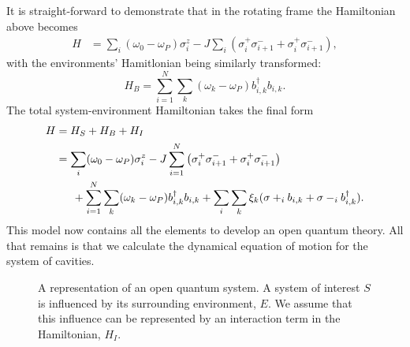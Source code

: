 \documentclass[11pt,a4paper,article,oneside]{memoir}
\newcommand{\Gap}{\,\,\,\,\,\,\,\,\,} \newcommand{\Ua}{\uparrow}
\begin{document}
It is straight-forward to demonstrate that in the rotating frame the
Hamiltonian above becomes
\begin{align}
  H&=\sum_i(\omega_0-\omega_P) \sigma^z_i -J \sum_i
  (\sigma^+_i\sigma^-_{i+1}+\sigma^+_i\sigma^-_{i+1}),
\end{align}
with the environments' Hamitlonian being similarly transformed:
\begin{equation}
  H_B = \sum_{i=1}^N\sum_k(\omega_k-\omega_P)b^\dagger_{i,k}b_{i,k}.
\end{equation}
The total system-environment Hamiltonian takes the final form
\begin{align}
  H &= H_S + H_B + H_I \notag \\ &= \sum_i(\omega_0-\omega_P)
  \sigma^z_i-J\sum_{i=1}^N
  \left(\sigma^+_i\sigma^-_{i+1}+\sigma^+_i\sigma^-_{i+1}\right)
  \notag
  \\ &\Gap+\sum_{i=1}^N\sum_k(\omega_k-\omega_P)b^\dagger_{i,k}b_{i,k}
  + \sum_i \sum_k \xi_k (\sigma+_ib_{i,k}+\sigma-_ib^\dagger_{i,k}).
\end{align}
This model now contains all the elements to develop an open quantum
theory. All that remains is that we calculate the dynamical equation
of motion for the system of cavities.
\begin{figure}
  \begin{center}
  \end{center}
  \caption{A representation of an open quantum system. A system of
    interest $S$ is influenced by its surrounding environment, $E$. We
    assume that this influence can be represented by an interaction
    term in the Hamiltonian, $H_I$.}
  \label{fig:open}
\end{figure}
\end{document}
